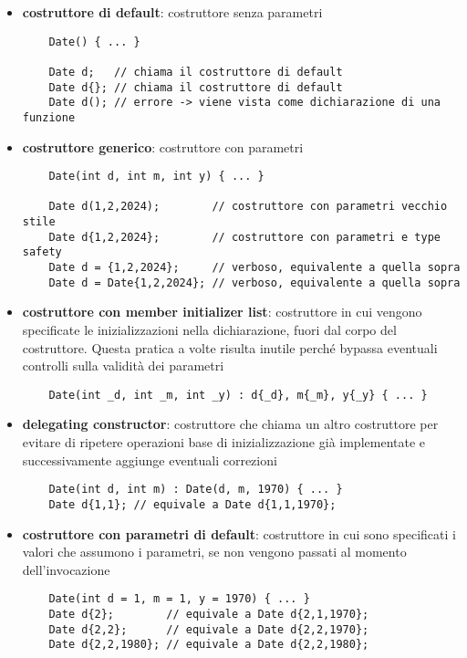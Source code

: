\documentclass[a4paper]{article}
\begin{document}
\begin{itemize}
\item \textbf{costruttore di default}: costruttore senza parametri
\begin{lstlisting}
	Date() { ... }

	Date d;   // chiama il costruttore di default
	Date d{}; // chiama il costruttore di default
	Date d(); // errore -> viene vista come dichiarazione di una funzione
\end{lstlisting}

\item \textbf{costruttore generico}: costruttore con parametri
\begin{lstlisting}
	Date(int d, int m, int y) { ... }
	
	Date d(1,2,2024);        // costruttore con parametri vecchio stile
	Date d{1,2,2024};        // costruttore con parametri e type safety
	Date d = {1,2,2024};     // verboso, equivalente a quella sopra
	Date d = Date{1,2,2024}; // verboso, equivalente a quella sopra
\end{lstlisting}

\item \textbf{costruttore con member initializer list}: costruttore in cui vengono specificate le inizializzazioni nella
dichiarazione, fuori dal corpo del costruttore. Questa pratica a volte risulta inutile perché bypassa eventuali controlli
sulla validità dei parametri
\begin{lstlisting}
	Date(int _d, int _m, int _y) : d{_d}, m{_m}, y{_y} { ... }
\end{lstlisting}

\item \textbf{delegating constructor}: costruttore che chiama un altro costruttore per evitare di ripetere operazioni base di
inizializzazione già implementate e successivamente aggiunge eventuali correzioni
\begin{lstlisting}
	Date(int d, int m) : Date(d, m, 1970) { ... }
	Date d{1,1}; // equivale a Date d{1,1,1970};
\end{lstlisting}

\item \textbf{costruttore con parametri di default}: costruttore in cui sono specificati i valori che assumono i parametri, se
non vengono passati al momento dell'invocazione
\begin{lstlisting}
	Date(int d = 1, m = 1, y = 1970) { ... }
	Date d{2};        // equivale a Date d{2,1,1970};
	Date d{2,2};      // equivale a Date d{2,2,1970};
	Date d{2,2,1980}; // equivale a Date d{2,2,1980};
\end{lstlisting}


\end{itemize}
\end{document}
